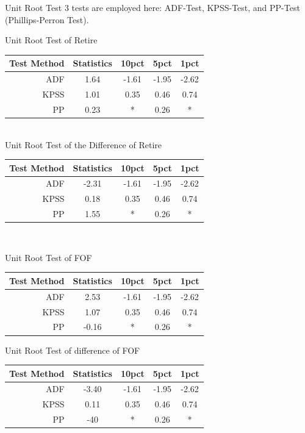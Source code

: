 \documentclass[xcolor=dvipsnames]{beamer}
\begin{document}
\begin{frame}{Unit Root Test}
	3 tests are employed here: ADF-Test, KPSS-Test, and PP-Test (Phillips-Perron Test).

	Unit Root Test of Retire\\
	\par
	\begin{tabular}{|r |c |c |c| c|}
		\hline
		Test Method&Statistics & 10pct & 5pct & 1pct \\  \hline
		ADF & 1.64 &-1.61 & -1.95&-2.62 \\  \hline
		KPSS & 1.01 & 0.35 & 0.46 & 0.74 \\  \hline
		PP & 0.23 & *  &0.26 & *\\  \hline
	\end{tabular}
	\\
	\bigskip
	Unit Root Test of the Difference of Retire \\
	\begin{tabular}{|r |c |c |c| c|}
		\hline
		Test Method&Statistics & 10pct & 5pct & 1pct \\  \hline
		ADF & -2.31 &-1.61 & -1.95&-2.62 \\  \hline
		KPSS & 0.18 & 0.35 & 0.46 & 0.74 \\  \hline
		PP & 1.55 & *  &0.26 & *\\  \hline
	\end{tabular}	
	\\
	\bigskip
	\par
	Unit Root Test of FOF \\
	\begin{tabular}{|r |c |c |c| c|}
		\hline
		Test Method&Statistics & 10pct & 5pct & 1pct \\  \hline
		ADF & 2.53 &-1.61 & -1.95&-2.62 \\  \hline
		KPSS & 1.07 & 0.35 & 0.46 & 0.74 \\  \hline
		PP & -0.16 & *  &0.26 & *\\  \hline
	\end{tabular}
	\par
	Unit Root Test of difference of FOF \\
	\begin{tabular}{|r |c |c |c| c|}
		\hline
		Test Method&Statistics & 10pct & 5pct & 1pct \\  \hline
		ADF & -3.40 &-1.61 & -1.95&-2.62 \\  \hline
		KPSS & 0.11 & 0.35 & 0.46 & 0.74 \\  \hline
		PP & -40 & *  &0.26 & *\\  \hline
	\end{tabular}

\end{frame}
\end{document}
